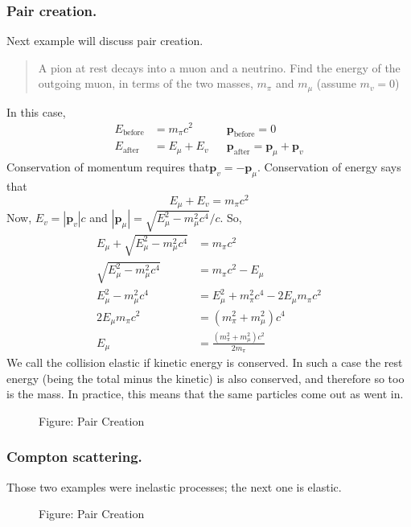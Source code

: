 \documentclass[../../main.tex]{subfiles}
\begin{document}
\subsubsection{Pair creation.} Next example will discuss pair creation. 
\begin{quote}
    A pion at rest decays into a muon and a neutrino. Find the energy of the outgoing muon, in terms of the two masses, $m_\pi$ and $m_\mu$ (assume $m_v = 0$)
\end{quote}
In this case,
\begin{align*}
    E_{\text{before}}&=m_\pi c^2&&\mathbf{p}_{\text{before}}=0\\
    E_{\text{after}}&=E_\mu+E_v&&\mathbf{p}_{\text{after}}=\mathbf{p}_\mu+\mathbf{p}_v
\end{align*}
Conservation of momentum requires that$ \mathbf{p}_v = -\mathbf{p}_\mu$. Conservation of energy says that
\begin{equation*}
   E_\mu+E_v= m_\pi c^2
\end{equation*}
Now, $E_v = |\mathbf{p}_v |c$ and $| \mathbf{p}_\mu |=\sqrt{E_\mu^2-m^2_\mu c^4}/c$. So,
\begin{align*}
    E_\mu+\sqrt{E_\mu^2-m^2_\mu c^4}&=m_\pi c^2\\
    \sqrt{E_\mu^2-m^2_\mu c^4}&=m_\pi c^2-E_\mu\\
    E_\mu^2-m^2_\mu c^4&=E_\mu^2+m_\pi^2 c^4-2E_\mu m_\pi c^2\\
    2E_\mu m_\pi c^2&=(m_\pi^2+m^2_\mu)c^4\\
    E_\mu&=\frac{(m^2_\pi+m^2_\mu)c^2}{2m_\pi}
\end{align*}
We call the collision elastic if kinetic energy is conserved. In such a case the rest energy (being the total minus the kinetic) is also conserved, and therefore so too is the mass. In practice, this means that the same particles come out as went in. 
\begin{figure}[t]
    \centering
    \caption*{Figure: Pair Creation}
\end{figure}

\subsubsection{Compton scattering.} Those two examples were inelastic processes; the next one is elastic.
\begin{figure}[b]
    \centering
    \caption*{Figure: Pair Creation}
\end{figure}
\end{document}
